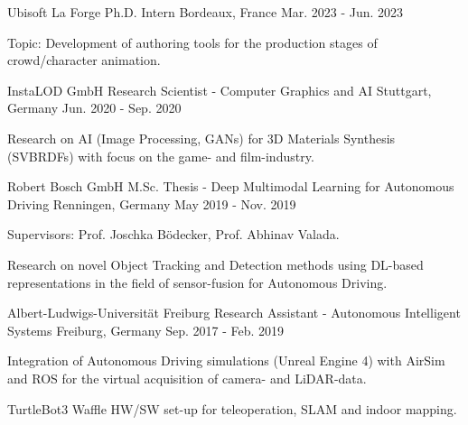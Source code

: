 

\begin{cventries}

  \cventry
    {Ubisoft La Forge} %
    {Ph.D. Intern} %
    {Bordeaux, France} %
    {Mar. 2023 - Jun. 2023} %
    {
      \begin{cvitems} %
        \item {Topic: Development of authoring tools for the production stages of crowd/character animation.}
      \end{cvitems}
    }

\cventry
    {InstaLOD GmbH} %
    {Research Scientist - Computer Graphics and AI} %
    {Stuttgart, Germany} %
    {Jun. 2020 - Sep. 2020} %
    {
      \begin{cvitems} %
        \item {Research on AI (Image Processing, GANs) for 3D Materials Synthesis (SVBRDFs) with focus on the game- and film-industry.}
      \end{cvitems}
    }

\cventry
    {Robert Bosch GmbH} %
    {M.Sc. Thesis - Deep Multimodal Learning for Autonomous Driving} %
    {Renningen, Germany} %
    {May 2019 - Nov. 2019} %
    {
      \begin{cvitems} %
        \item {Supervisors: Prof. Joschka Bödecker, Prof. Abhinav Valada.}
        \item {Research on novel Object Tracking and Detection methods using DL-based representations in the field of sensor-fusion for Autonomous Driving.}
      \end{cvitems}
    }

\cventry
    {Albert-Ludwigs-Universität Freiburg} %
    {Research Assistant - Autonomous Intelligent Systems} %
    {Freiburg, Germany} %
    {Sep. 2017 - Feb. 2019} %
    {
      \begin{cvitems} %
        \item {Integration of Autonomous Driving simulations (Unreal Engine 4) with AirSim and ROS for the virtual acquisition of camera- and LiDAR-data.}
        \item {TurtleBot3 Waffle HW/SW set-up for teleoperation, SLAM and indoor mapping.}
      \end{cvitems}
    }


\end{cventries}
